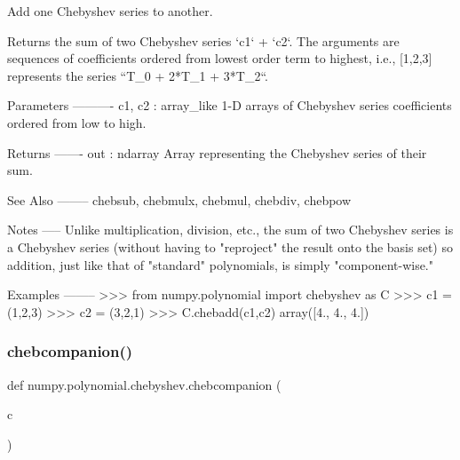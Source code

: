 \begin{DoxyVerb}Add one Chebyshev series to another.

Returns the sum of two Chebyshev series `c1` + `c2`.  The arguments
are sequences of coefficients ordered from lowest order term to
highest, i.e., [1,2,3] represents the series ``T_0 + 2*T_1 + 3*T_2``.

Parameters
----------
c1, c2 : array_like
    1-D arrays of Chebyshev series coefficients ordered from low to
    high.

Returns
-------
out : ndarray
    Array representing the Chebyshev series of their sum.

See Also
--------
chebsub, chebmulx, chebmul, chebdiv, chebpow

Notes
-----
Unlike multiplication, division, etc., the sum of two Chebyshev series
is a Chebyshev series (without having to "reproject" the result onto
the basis set) so addition, just like that of "standard" polynomials,
is simply "component-wise."

Examples
--------
>>> from numpy.polynomial import chebyshev as C
>>> c1 = (1,2,3)
>>> c2 = (3,2,1)
>>> C.chebadd(c1,c2)
array([4., 4., 4.])\end{DoxyVerb}
 \mbox{\label{namespacenumpy_1_1polynomial_1_1chebyshev_a3a4cf8a6d01561f6fc9e83a4a7641d4a}} 
\subsubsection{\texorpdfstring{chebcompanion()}{chebcompanion()}}
{\footnotesize\ttfamily def numpy.\+polynomial.\+chebyshev.\+chebcompanion (\begin{DoxyParamCaption}\item[{}]{c }\end{DoxyParamCaption})}

